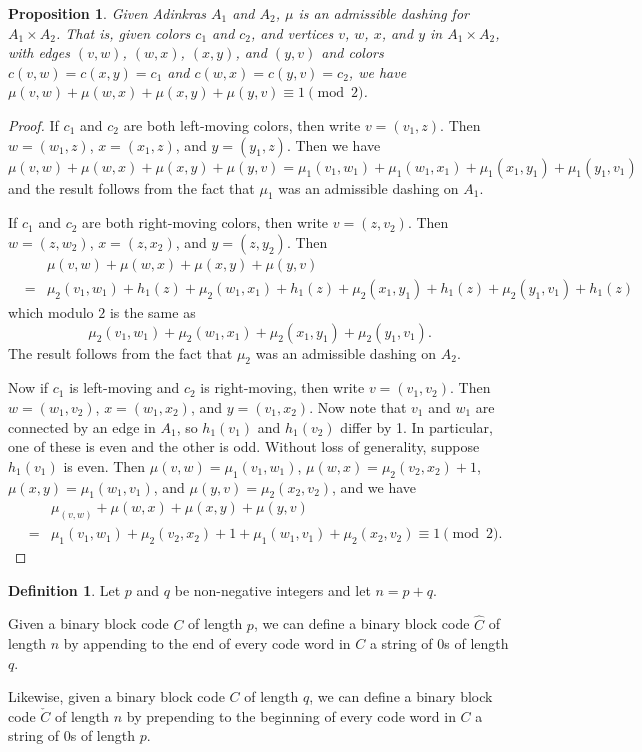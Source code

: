 \documentclass[12pt,twoside,singlespace]{article}
\numberwithin{equation}{section}
\newtheorem{prop}[equation]{Proposition}
\theoremstyle{definition}
\newtheorem{definition}[equation]{Definition}
\begin{document}
\begin{prop}
Given Adinkras $A_1$ and $A_2$, $\mu$ is an admissible dashing for $A_1\times A_2$.  That is, given colors $c_1$ and $c_2$, and vertices $v$, $w$, $x$, and $y$ in $A_1\times A_2$, with edges $(v,w)$, $(w,x)$, $(x,y)$, and $(y,v)$ and colors $c(v,w)=c(x,y)=c_1$ and $c(w,x)=c(y,v)=c_2$, we have $\mu(v,w)+\mu(w,x)+\mu(x,y)+\mu(y,v)\equiv 1 \pmod{2}$.
\end{prop}
\begin{proof}
If $c_1$ and $c_2$ are both left-moving colors, then write $v=(v_1,z)$.  Then $w=(w_1,z)$, $x=(x_1,z)$, and $y=(y_1,z)$.  Then we have
\[\mu(v,w)+\mu(w,x)+\mu(x,y)+\mu(y,v)
= \mu_1(v_1,w_1)+\mu_1(w_1,x_1)+\mu_1(x_1,y_1)+\mu_1(y_1,v_1)\]
and the result follows from the fact that $\mu_1$ was an admissible dashing on $A_1$.

If $c_1$ and $c_2$ are both right-moving colors, then write $v=(z,v_2)$.  Then $w=(z,w_2)$, $x=(z,x_2)$, and $y=(z,y_2)$.  Then
\begin{eqnarray*}
&&\mu(v,w)+\mu(w,x)+\mu(x,y)+\mu(y,v)\\
&=& \mu_2(v_1,w_1)+h_1(z)+\mu_2(w_1,x_1)+h_1(z)+\mu_2(x_1,y_1)+h_1(z)+\mu_2(y_1,v_1)+h_1(z)
\end{eqnarray*}
which modulo $2$ is the same as 
\[\mu_2(v_1,w_1)+\mu_2(w_1,x_1)+\mu_2(x_1,y_1)+\mu_2(y_1,v_1).\]
The result follows from the fact that $\mu_2$ was an admissible dashing on $A_2$.


Now if $c_1$ is left-moving and $c_2$ is right-moving, then write $v=(v_1,v_2)$.  Then $w=(w_1,v_2)$, $x=(w_1,x_2)$, and $y=(v_1,x_2)$.  Now note that $v_1$ and $w_1$ are connected by an edge in $A_1$, so $h_1(v_1)$ and $h_1(v_2)$ differ by 1.  In particular, one of these is even and the other is odd.  Without loss of generality, suppose $h_1(v_1)$ is even.  Then $\mu(v,w)=\mu_1(v_1,w_1)$, $\mu(w,x)=\mu_2(v_2,x_2)+1$, $\mu(x,y)=\mu_1(w_1,v_1)$, and $\mu(y,v)=\mu_2(x_2,v_2)$, and we have
\begin{eqnarray*}
&&\mu_(v,w)+\mu(w,x)+\mu(x,y)+\mu(y,v)\\
&=&\mu_1(v_1,w_1)+\mu_2(v_2,x_2)+1+\mu_1(w_1,v_1)+\mu_2(x_2,v_2)\equiv 1\pmod{2}.
\end{eqnarray*}
\end{proof}


\begin{definition}
Let $p$ and $q$ be non-negative integers and let $n=p+q$.

Given a binary block code $C$ of length $p$, we can define a binary block code $\hat{C}$ of length $n$ by appending to the end of every code word in $C$ a string of $0$s of length $q$.

Likewise, given a binary block code $C$ of length $q$, we can define a binary block code $\check{C}$ of length $n$ by prepending to the beginning of every code word in $C$ a string of $0$s of length $p$.
\end{definition}
\end{document}
